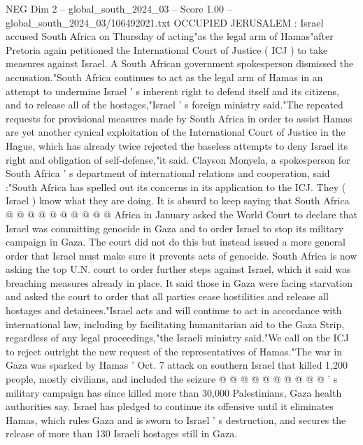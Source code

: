 \begin{textsample}{NEG Dim 2 – global\_south\_2024\_03 – Score 1.00 – global\_south\_2024\_03/106492021.txt}  \label{ex:f2_neg_113}
OCCUPIED JERUSALEM : Israel accused South Africa on Thursday of acting"as the legal arm of Hamas"after Pretoria again petitioned the International Court of Justice ( ICJ ) to take measures against Israel.
A South African government spokesperson dismissed the accusation."South Africa continues to act as the legal arm of Hamas in an attempt to undermine Israel ' s inherent right to defend itself and its citizens, and to release all of the hostages,"Israel ' s foreign ministry said."The repeated requests for provisional measures made by South Africa in order to assist Hamas are yet another cynical exploitation of the International Court of Justice in the Hague, which has already twice rejected the baseless attempts to deny Israel its right and obligation of self-defense,"it said.
Clayson Monyela, a spokesperson for South Africa ' s department of international relations and cooperation, said :"South Africa has spelled out its concerns in its application to the ICJ.
They ( Israel ) know what they are doing.
It is absurd to keep saying that South Africa @ @ @ @ @ @ @ @ @ @ Africa in January asked the World Court to declare that Israel was committing genocide in Gaza and to order Israel to stop its military campaign in Gaza.
The court did not do this but instead issued a more general order that Israel must make sure it prevents acts of genocide.
South Africa is now asking the top U.N. court to order further steps against Israel, which it said was breaching measures already in place.
It said those in Gaza were facing starvation and asked the court to order that all parties cease hostilities and release all hostages and detainees."Israel acts and will continue to act in accordance with international law, including by facilitating humanitarian aid to the Gaza Strip, regardless of any legal proceedings,"the Israeli ministry said."We call on the ICJ to reject outright the new request of the representatives of Hamas."The war in Gaza was sparked by Hamas ' Oct. 7 attack on southern Israel that killed 1,200 people, mostly civilians, and included the seizure @ @ @ @ @ @ @ @ @ @ ' s military campaign has since killed more than 30,000 Palestinians, Gaza health authorities say.
Israel has pledged to continue its offensive until it eliminates Hamas, which rules Gaza and is sworn to Israel ' s destruction, and secures the release of more than 130 Israeli hostages still in Gaza.

\end{textsample}
